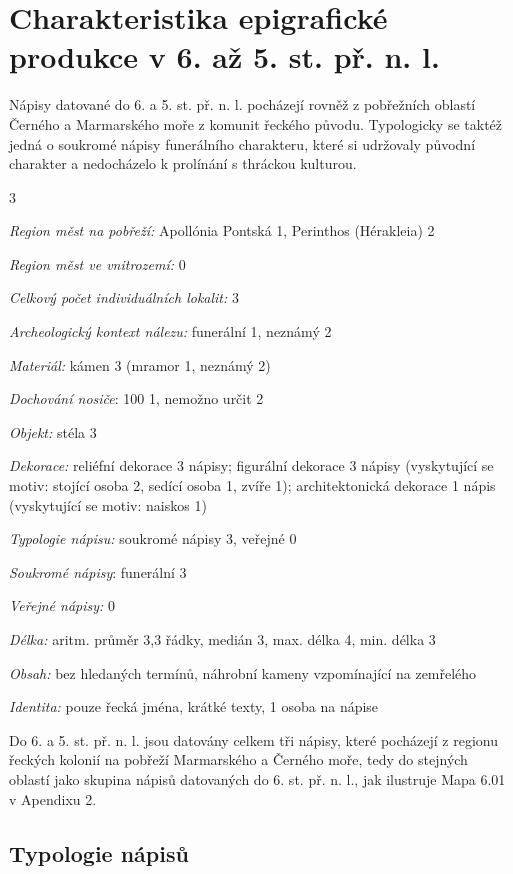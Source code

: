 \section[charakteristika-epigrafické-produkce-v-6.-až-5.-st.-př.-n.-l.]{Charakteristika epigrafické produkce v 6. až 5. st. př. n. l.}

Nápisy datované do 6. a 5. st. př. n. l. pocházejí rovněž z pobřežních oblastí Černého a Marmarského moře z komunit řeckého původu. Typologicky se taktéž jedná o soukromé nápisy funerálního charakteru, které si udržovaly původní charakter a nedocházelo k prolínání s thráckou kulturou.

\placetable[none]{}
\starttable[|l|]
\HL
{} 3

{\em Region měst na pobřeží:} Apollónia Pontská 1, Perinthos (Hérakleia) 2

{\em Region měst ve vnitrozemí:} 0

{\em Celkový počet individuálních lokalit:} 3

{\em Archeologický kontext nálezu:} funerální 1, neznámý 2

{\em Materiál:} kámen 3 (mramor 1, neznámý 2)

{\em Dochování nosiče}: 100  1, nemožno určit 2

{\em Objekt:} stéla 3

{\em Dekorace:} reliéfní dekorace 3 nápisy; figurální dekorace 3 nápisy (vyskytující se motiv: stojící osoba 2, sedící osoba 1, zvíře 1); architektonická dekorace 1 nápis (vyskytující se motiv: naiskos 1)

{\em Typologie nápisu:} soukromé nápisy 3, veřejné 0

{\em Soukromé nápisy}: funerální 3

{\em Veřejné nápisy:} 0

{\em Délka:} aritm. průměr 3,3 řádky, medián 3, max. délka 4, min. délka 3

{\em Obsah:} bez hledaných termínů, náhrobní kameny vzpomínající na zemřelého

{\em Identita:} pouze řecká jména, krátké texty, 1 osoba na nápise

\NC\AR
\HL
\HL
\stoptable

Do 6. a 5. st. př. n. l. jsou datovány celkem tři nápisy, které pocházejí z regionu řeckých kolonií na pobřeží Marmarského a Černého moře, tedy do stejných oblastí jako skupina nápisů datovaných do 6. st. př. n. l., jak ilustruje Mapa 6.01 v Apendixu 2.

\subsection[typologie-nápisů-1]{Typologie nápisů}

